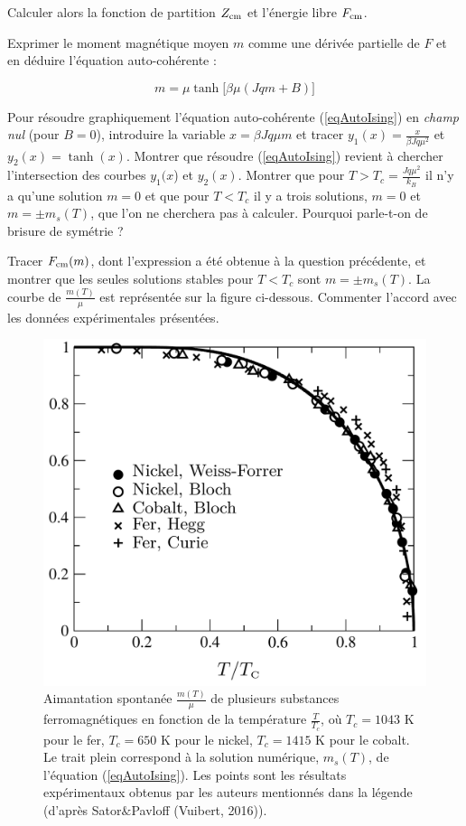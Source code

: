 \documentclass[utf8, 11pt]{feuille}
\begin{document}
\question
Calculer alors la fonction de partition $Z_{\rm cm}$ et l'énergie libre $F_{\rm cm}$.

\question
Exprimer le moment magnétique moyen $m$ comme une dérivée partielle de $F$ et en déduire l'équation auto-cohérente :

\begin{equation} \label{eqAutoIsing}
m=\mu \tanh  \big[ \beta \mu(J q m +B) \big]
\end{equation}

\question
Pour résoudre graphiquement l'équation auto-cohérente (\ref{eqAutoIsing}) en {\it champ nul} (pour $B=0$), introduire la variable $x=\beta  J q \mu m$  et tracer $y_1(x)=\frac{x}{\beta  J q \mu^2}$ et $y_2(x)=\tanh (x) $. Montrer que résoudre (\ref{eqAutoIsing}) revient à chercher l'intersection des courbes $y_1(x$) et $y_2(x)$. Montrer que pour $T> T_c =\frac{Jq\mu^2}{k_B}$ il n'y a qu'une solution $m=0$ et que pour $T< T_c$ il y a trois solutions, $m=0$ et $m=\pm m_s(T)$, que l'on ne cherchera pas à calculer.  Pourquoi parle-t-on de brisure de symétrie ?

\question
Tracer $F_{\rm cm}(m)$, dont l'expression a été obtenue à la question précédente, et montrer que les seules solutions stables pour $T<T_c$ sont $m=\pm m_s(T)$.  La courbe de $\frac{m(T)}{\mu}$ est représentée sur la figure ci-dessous. Commenter l'accord avec les données expérimentales présentées.

\begin{figure}[h!]
\centering
\includegraphics[scale=0.6,angle=0]{ising}
\caption{Aimantation spontanée $\frac{m(T)}{\mu}$ de plusieurs substances ferromagnétiques en fonction de la température $\frac{T}{T_c}$, où $T_c=1043$ K pour le fer, $T_c=650$ K pour le nickel, $T_c=1415$ K pour le cobalt. Le trait plein correspond à la solution numérique, $m_s(T)$, de l'équation (\ref{eqAutoIsing}). Les points sont les résultats expérimentaux obtenus par les auteurs mentionnés dans la légende (d'après Sator$\&$Pavloff (Vuibert, 2016)).}
\end{figure}
\end{document}
